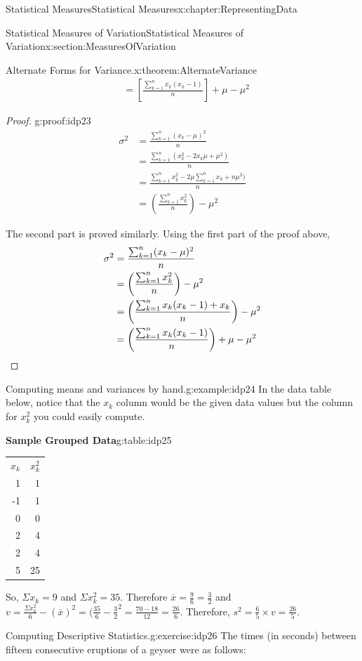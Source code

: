 \documentclass[oneside,10pt,]{book}
\newcommand{\tabularfont}{\relax}
\newcommand{\qedhere}{\relax}
\numberwithin{equation}{section}
\newcommand{\hrulemedium}{\noalign{\hrule height 0.07em}}
\begin{document}
\begin{chapterptx}{Statistical Measures}{}{Statistical Measures}{}{}{x:chapter:RepresentingData}
\begin{sectionptx}{Statistical Measures of Variation}{}{Statistical Measures of Variation}{}{}{x:section:MeasuresOfVariation}
\begin{theorem}{Alternate Forms for Variance.}{}{x:theorem:AlternateVariance}
\begin{align*}
& = \left [ \frac{\sum_{k=1}^n x_k(x_k - 1)}{n} \right ] + \mu - \mu^2
\end{align*}
\end{theorem}
\begin{proof}{}{g:proof:idp23}
%
\begin{align*}
\sigma^2 & = \frac{\sum_{k=1}^n ( x_k-\mu )^2}{n}\\
& = \frac{\sum_{k=1}^n ( x_k^2 - 2x_k \mu + \mu^2 )}{n}\\
& = \frac{\sum_{k=1}^n x_k^2 - 2\mu \sum_{k=1}^n x_k  + n \mu^2 )}{n}\\
& = \left ( \frac{\sum_{k=1}^n x_k^2 }{n} \right ) - \mu^2
\end{align*}
%
\par
The second part is proved similarly. Using the first part of the proof above,%
\begin{align*}
\sigma^2 & = \frac{\sum_{k=1}^n ( x_k-\mu )^2}{n}\\
& = \left ( \frac{\sum_{k=1}^n x_k^2 }{n} \right ) - \mu^2\\
& = \left ( \frac{\sum_{k=1}^n x_k (x_k - 1) + x_k }{n} \right ) - \mu^2\\
& = \left ( \frac{\sum_{k=1}^n x_k (x_k - 1)}{n} \right ) + \mu - \mu^2\qedhere
\end{align*}
%
\end{proof}
\begin{example}{Computing means and variances by hand.}{g:example:idp24}%
In the data table below, notice that the \(x_k\) column would be the given data values but the column for \(x_k^2\) you could easily compute. \begin{tableptx}{\textbf{Sample Grouped Data}}{g:table:idp25}{}%
\centering
{\tabularfont%
\begin{tabular}{rr}
\(x_k\)&\(x_k^2\)\tabularnewline\hrulemedium
1&1\tabularnewline[0pt]
-1&1\tabularnewline[0pt]
0&0\tabularnewline[0pt]
2&4\tabularnewline[0pt]
2&4\tabularnewline[0pt]
5&25
\end{tabular}
}%
\end{tableptx}%
 So, \(\Sigma x_k = 9\) and \(\Sigma x_k^2 = 35\).  Therefore \(\overline{x} = \frac{9}{6} = \frac{3}{2}\) and \(v = \frac{\Sigma x_k^2}{6} - (\overline{x})^2 = ( \frac{35}{6} - \frac{3}{2}^2 = \frac{70-18}{12} = \frac{26}{6}\).  Therefore, \(s^2 = \frac{6}{5} \times v = \frac{26}{5}\).%
\end{example}
\begin{inlineexercise}{Computing Descriptive Statistics.}{g:exercise:idp26}%
The times (in seconds) between fifteen consecutive eruptions of a geyser were as follows:%

\end{inlineexercise}
\end{sectionptx}
\end{chapterptx}
\end{document}
